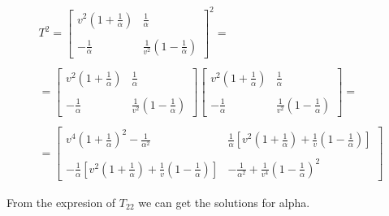 \begin{equation}
  \label{5.12}
  \begin{array}{c}
    T^2 = \left[
      \begin{array}{cc}
        v^2(1+\frac{1}{\alpha}) & \frac{1}{\alpha}
        \\

        \\
        -\frac{1}{\alpha} & \frac{1}{v^2}(1-\frac{1}{\alpha})
      \end{array}
    \right]^2=

    \\

    \\

    =\left[
      \begin{array}{cc}
        v^2(1+\frac{1}{\alpha}) & \frac{1}{\alpha}
        \\

        \\
        -\frac{1}{\alpha} & \frac{1}{v^2}(1-\frac{1}{\alpha})
      \end{array}
    \right]
    \left[
      \begin{array}{cc}
        v^2(1+\frac{1}{\alpha}) & \frac{1}{\alpha}
        \\

        \\
        -\frac{1}{\alpha} & \frac{1}{v^2}(1-\frac{1}{\alpha})
      \end{array}
    \right] =

    \\

    \\

    =
    \left[
      \begin{array}{cc}
        v^4(1+\frac{1}{\alpha})^2-\frac{1}{\alpha^2} & \frac{1}{\alpha}[v^2(1+\frac{1}{\alpha})+\frac{1}{v}(1-\frac{1}{\alpha})]
        \\

        \\
        -\frac{1}{\alpha}[v^2(1+\frac{1}{\alpha})+\frac{1}{v}(1-\frac{1}{\alpha})] & -\frac{1}{\alpha^2} + \frac{1}{v^4}(1-\frac{1}{\alpha})^2
      \end{array}
    \right]
  \end{array}
\end{equation}

From the expresion of $T_{22}$ we can get the solutions for alpha.

